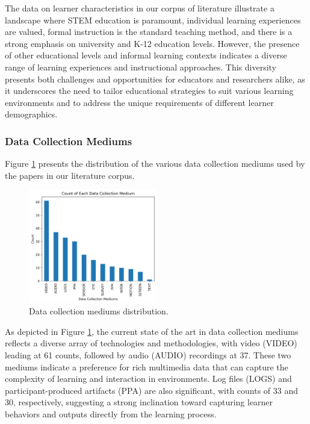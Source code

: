 \documentclass[manuscript,screen,review]{acmart}
\begin{document}
The data on learner characteristics in our corpus of literature illustrate a landscape where STEM education is paramount, individual learning experiences are valued, formal instruction is the standard teaching method, and there is a strong emphasis on university and K-12 education levels. However, the presence of other educational levels and informal learning contexts indicates a diverse range of learning experiences and instructional approaches. This diversity presents both challenges and opportunities for educators and researchers alike, as it underscores the need to tailor educational strategies to suit various learning environments and to address the unique requirements of different learner demographics.


\subsubsection{Data Collection Mediums}

Figure \ref{fig:data_collection_mediums} presents the distribution of the various data collection mediums used by the papers in our literature corpus.

\begin{figure}
  \begin{center}
        \includegraphics[width=0.5\textwidth]{img/statistical_imgs/data_collection_mediums.png}
  \end{center}
  \caption{Data collection mediums distribution.}
  \label{fig:data_collection_mediums}
\end{figure}

As depicted in Figure \ref{fig:data_collection_mediums}, the current state of the art in data collection mediums reflects a diverse array of technologies and methodologies, with video (VIDEO) leading at 61 counts, followed by audio (AUDIO) recordings at 37. These two mediums indicate a preference for rich multimedia data that can capture the complexity of learning and interaction in environments. Log files (LOGS) and participant-produced artifacts (PPA) are also significant, with counts of 33 and 30, respectively, suggesting a strong inclination toward capturing learner behaviors and outputs directly from the learning process.
\end{document}
